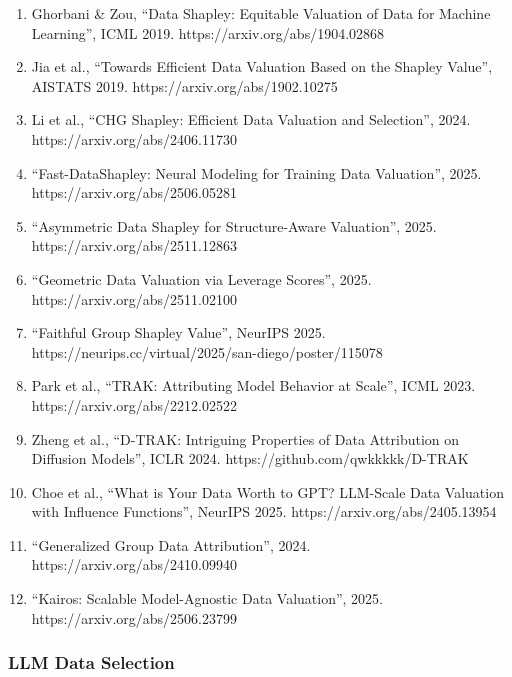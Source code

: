 \documentclass[
  12pt,
]{article}
\providecommand{\tightlist}{%
  \setlength{\itemsep}{0pt}\setlength{\parskip}{0pt}}
\begin{document}
\begin{enumerate}
\def\labelenumi{\arabic{enumi}.}
\tightlist
\item
  Ghorbani \& Zou, ``Data Shapley: Equitable Valuation of Data for
  Machine Learning'', ICML 2019. https://arxiv.org/abs/1904.02868
\item
  Jia et al., ``Towards Efficient Data Valuation Based on the Shapley
  Value'', AISTATS 2019. https://arxiv.org/abs/1902.10275
\item
  Li et al., ``CHG Shapley: Efficient Data Valuation and Selection'',
  2024. https://arxiv.org/abs/2406.11730
\item
  ``Fast-DataShapley: Neural Modeling for Training Data Valuation'',
  2025. https://arxiv.org/abs/2506.05281
\item
  ``Asymmetric Data Shapley for Structure-Aware Valuation'', 2025.
  https://arxiv.org/abs/2511.12863
\item
  ``Geometric Data Valuation via Leverage Scores'', 2025.
  https://arxiv.org/abs/2511.02100
\item
  ``Faithful Group Shapley Value'', NeurIPS 2025.
  https://neurips.cc/virtual/2025/san-diego/poster/115078
\item
  Park et al., ``TRAK: Attributing Model Behavior at Scale'', ICML 2023.
  https://arxiv.org/abs/2212.02522
\item
  Zheng et al., ``D-TRAK: Intriguing Properties of Data Attribution on
  Diffusion Models'', ICLR 2024. https://github.com/qwkkkkk/D-TRAK
\item
  Choe et al., ``What is Your Data Worth to GPT? LLM-Scale Data
  Valuation with Influence Functions'', NeurIPS 2025.
  https://arxiv.org/abs/2405.13954
\item
  ``Generalized Group Data Attribution'', 2024.
  https://arxiv.org/abs/2410.09940
\item
  ``Kairos: Scalable Model-Agnostic Data Valuation'', 2025.
  https://arxiv.org/abs/2506.23799
\end{enumerate}

\subsubsection{LLM Data Selection}\label{llm-data-selection}
\end{document}

